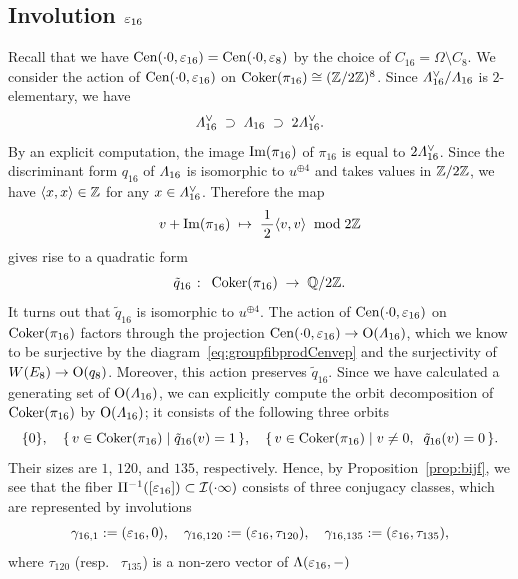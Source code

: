 \documentclass{amsart} %
\begin{document}
\subsection{Involution $\varepsilon_{16}$}\label{subsec:vep16}
%
Recall that we have $\mathrm{Cen}(\cdot 0, \varepsilon_{16})=\mathrm{Cen}(\cdot 0, \varepsilon_{8})$
by the choice of $C_{16}=\Omega\setminus C_8$.
We consider the action of $\mathrm{Cen}(\cdot 0, \varepsilon_{16})$
on $\operatorname{Coker}(\pi_{16})\cong (\mathord{\mathbb{Z}}/2\mathord{\mathbb{Z}})^8$.
Since $\varLambda_{16}^{\vee}/\varLambda_{16}$ 
is $2$-elementary,
we have
%
\begin{equation} \label{eq:filteration}
\varLambda_{16}^{\vee} \;\supset\; \varLambda_{16}\; \supset \; 2\varLambda_{16}^{\vee}.
\end{equation}
%
By an explicit computation,
the image $\operatorname{Im}(\pi_{16})$ of $\pi_{16}$ is equal to $2\varLambda_{16}^{\vee}$.
Since the discriminant form $q_{16}$ of $\varLambda_{16}$ 
is isomorphic to $u^{\oplus 4}$ and takes values in $\mathord{\mathbb{Z}}/2\mathord{\mathbb{Z}}$,
we have $\langle x, x \rangle\in \mathord{\mathbb{Z}}$ for any $x\in \varLambda_{16}^{\vee}$.
Therefore the map
\[
v+\operatorname{Im} (\pi_{16}) \;\mapsto\; \frac{\,1\,}{2} \langle v, v \rangle \;\bmod 2\mathord{\mathbb{Z}}
\]
gives rise to a quadratic form 
\[
\tilde{q}_{16}\;\colon\; \operatorname{Coker} (\pi_{16})\;\to\; \mathord{\mathbb{Q}}/2\mathord{\mathbb{Z}}.
 \]
It turns out that $\tilde{q}_{16}$ is isomorphic to $u^{\oplus 4}$.
The action of $\mathrm{Cen}(\cdot 0, \varepsilon_{16})$ on $\operatorname{Coker} (\pi_{16})$ 
factors through the projection
$\mathrm{Cen}(\cdot 0, \varepsilon_{16})\to \mathord{\mathrm{O}}(\varLambda_{16})$,
which we know to be surjective
by the diagram~\eqref{eq:groupfibprodCenvep} and the surjectivity of 
$W(E_8)\to \mathord{\mathrm{O}}(q_8)$. 
Moreover, this action 
preserves $\tilde{q}_{16}$.
Since we have calculated a generating set of $\mathord{\mathrm{O}}(\varLambda_{16})$,
we can explicitly compute the orbit decomposition of $\operatorname{Coker} (\pi_{16})$
by $\mathord{\mathrm{O}}(\varLambda_{16})$; it consists of the following three orbits 
\[
\{0\},\quad 
\{\,{v \in\operatorname{Coker} (\pi_{16}) }\mid {\tilde{q}_{16}(v)=1} \,\},
\quad
\{\,{v \in\operatorname{Coker} (\pi_{16}) }\mid {v\ne 0, \;\; \tilde{q}_{16}(v)=0} \,\}.
\]
Their sizes are $1$, $120$, and $135$, respectively.
Hence, by Proposition~\ref{prop:bijf}, 
 we see that the fiber $\Pi^{-1} ([\varepsilon_{16}])\subset \mathord{\mathcal{I}}(\cdot \infty)$ consists of three conjugacy classes,
 which are 
 represented by involutions
 \[
 \gamma_{16, 1}:=(\varepsilon_{16}, 0),
 \quad
 \gamma_{16, 120}:=(\varepsilon_{16}, \tau_{120}),
 \quad
 \gamma_{16, 135}:=(\varepsilon_{16}, \tau_{135}),
 \]
where $ \tau_{120}$ (resp. ~$\tau_{135}$) is a non-zero vector of $\Lambda(\varepsilon_{16}, -)$ 
\end{document}
